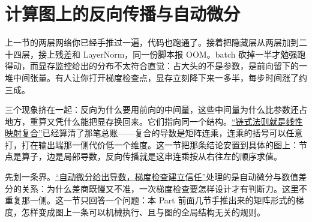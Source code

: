 \section{计算图上的反向传播与自动微分}
\label{sec:10-Matrix-Calculus/04-Applications/03}

上一节的两层网络你已经手推过一遍，代码也跑通了。接着把隐藏层从两层加到二十四层，接上残差和 LayerNorm，同一份脚本报 OOM。batch 砍掉一半才勉强跑得动，而显存监控给出的分布不太符合直觉：占大头的不是参数，是前向留下的一堆中间张量。有人让你打开梯度检查点，显存立刻降下来一多半，每步时间涨了约三成。

三个现象挤在一起：反向为什么要用前向的中间量，这些中间量为什么比参数还占地方，重算又凭什么能把显存换回来。它们指向同一个结构。\hyperref[sec:10-Matrix-Calculus/02-Differentials/02]{``链式法则就是线性映射复合''}已经算清了那笔总账——复合的导数是矩阵连乘，连乘的括号可以任意打，打在输出端那一侧代价低一个维度。这一节把那条结论安置到具体的图上：节点是算子，边是局部导数，反向传播就是这串连乘按从右往左的顺序求值。

先划一条界。\hyperref[sec:08-Numerical-Analysis/07-Numerical-Methods-for-ML/02]{``自动微分给出导数，梯度检查建立信任''}处理的是自动微分与数值差分的关系：为什么差商既慢又不准，一次梯度检查要怎样设计才有判断力。这里不重复那一侧。这一节只回答一个问题：本 Part 前面几节手推出来的矩阵形式的梯度，怎样变成图上一条可以机械执行、且与图的全局结构无关的规则。

